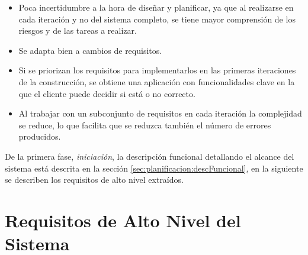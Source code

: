 \begin{itemize}

    \item[\ding{70}] Poca incertidumbre a la hora de diseñar y planificar, ya que al realizarse en cada iteración y no del sistema completo, se tiene mayor comprensión de los riesgos y de las tareas a realizar.

    \item[\ding{70}] Se adapta bien a cambios de requisitos.

    \item[\ding{70}] Si se priorizan los requisitos para implementarlos en las primeras iteraciones de la construcción, se obtiene una aplicación con funcionalidades clave en la que el cliente puede decidir si está o no correcto.

    \item[\ding{70}] Al trabajar con un subconjunto de requisitos en cada iteración la complejidad se reduce, lo que facilita que se reduzca también el número de errores producidos.

\end{itemize}

De la primera fase, \emph{iniciación}, la descripción funcional detallando el alcance del sistema está descrita en la sección \ref{sec:planificacion:descFuncional}, en la siguiente se describen los requisitos de alto nivel extraídos.



\section{Requisitos de Alto Nivel del Sistema}
\label{sec:planificacion:requisitos}

